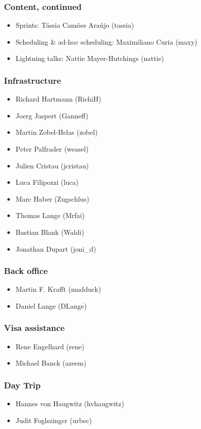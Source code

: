 \documentclass[t]{beamer}
\begin{document}
\begin{frame}
	\frametitle{Content, continued}
	\begin{itemize}
		\item Sprints: Tássia Camões Araújo (tassia)
		\item Scheduling \& ad-hoc scheduling: Maximiliano Curia (maxy)
		\item Lightning talks: Nattie Mayer-Hutchings (nattie)
	\end{itemize}
\end{frame}

\begin{frame}
	\frametitle{Infrastructure}
	\begin{itemize}
		\item Richard Hartmann (RichiH)
		\item Joerg Jaspert (Ganneff)
		\item Martin Zobel-Helas (zobel)
		\item Peter Palfrader (weasel)
		\item Julien Cristau (jcristau)
		\item Luca Filipozzi (luca)
		\item Marc Haber (Zugschlus)
		\item Thomas Lange (Mrfai)
		\item Bastian Blank (Waldi)
		\item Jonathan Dupart (joni\_d)
	\end{itemize}
\end{frame}

\begin{frame}
	\frametitle{Back office}
	\begin{itemize}
		\item Martin F. Krafft (madduck)
		\item Daniel Lange (DLange)
	\end{itemize}
\end{frame}

\begin{frame}
	\frametitle{Visa assistance}
	\begin{itemize}
		\item Rene Engelhard (rene)
		\item Michael Banck (azeem)
	\end{itemize}
\end{frame}

\begin{frame}
	\frametitle{Day Trip}
	\begin{itemize}
		\item Hannes von Haugwitz (hvhaugwitz)
		\item Judit Foglszinger (urbec)
	\end{itemize}
\end{frame}
\end{document}
